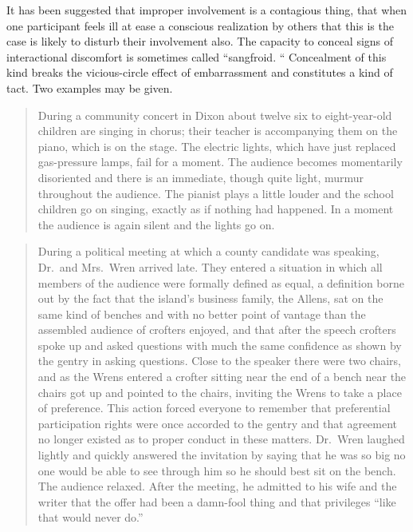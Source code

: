 \documentclass[openany,nobib]{tufte-book}
\begin{document}
It has been suggested that improper involvement is a contagious thing,
that when one participant feels ill at ease a conscious realization by
others that this is the case is likely to disturb their involvement
also. The capacity to conceal signs of interactional discomfort is
sometimes called ``sangfroid. `` Concealment of this kind breaks the
vicious-circle effect of embarrassment and constitutes a kind of tact.
Two examples may be given.

\begin{quote}
During a community concert in Dixon about twelve six to eight-year-old
children are singing in chorus; their teacher is accompanying them on
the piano, which is on the stage. The electric lights, which have just
replaced gas-pressure lamps, fail for a moment. The audience becomes
momentarily disoriented and there is an immediate, though quite light,
murmur throughout the audience. The pianist plays a little louder and
the school children go on singing, exactly as if nothing had happened.
In a moment the audience is again silent and the lights go on.
\end{quote}

\begin{quote}
During a political meeting at which a county candidate was speaking,
Dr.~and Mrs.~Wren arrived late. They entered a situation in which all
members of the audience were formally defined as equal, a definition
borne out by the fact that the island's business family, the Allens, sat
on the same kind of benches and with no better point of vantage than the
assembled audience of crofters enjoyed, and that after the speech
crofters spoke up and asked questions with much the same confidence as
shown by the gentry in asking questions. Close to the speaker there were
two chairs, and as the Wrens entered a crofter sitting near the end of a
bench near the chairs got up and pointed to the chairs, inviting the
Wrens to take a place of preference. This action forced everyone to
remember that preferential participation rights were once accorded to
the gentry and that agreement no longer existed as to proper conduct in
these matters. Dr.~Wren laughed lightly and quickly answered the
invitation by saying that he was so big no one would be able to see
through him so he should best sit on the bench. The audience relaxed.
After the meeting, he admitted to his wife and the writer that the offer
had been a damn-fool thing and that privileges ``like that would never
do.''
\end{quote}
\end{document}
